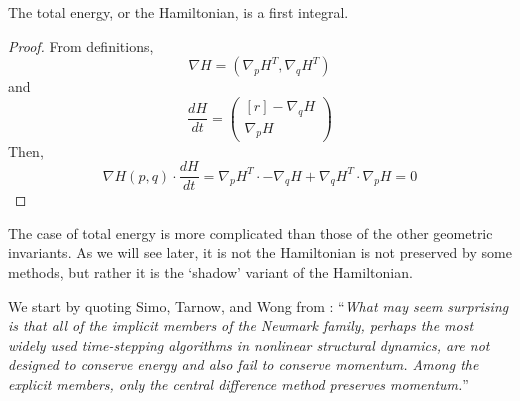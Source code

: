 \documentclass[../Main.tex]{subfiles}
\begin{document}
\begin{theorem} The total energy, or the Hamiltonian, is a first integral. \end{theorem}
\begin{proof}
From definitions,
$$
	\nabla H = \left(\nabla_{p}H^{T}, \nabla_{q}H^{T}\right)
$$
and
$$
	\frac{dH}{dt} =
		\begin{pmatrix*}[r]
			-\nabla_{q}H \\
			\nabla_{p}H
		\end{pmatrix*}
$$
Then, 
$$
\nabla H(p, q) \cdot \frac{dH}{dt} = \nabla_{p}H^{T}\cdot-\nabla_{q}H + \nabla_{q}H^{T}\cdot \nabla_{p}H = 0
$$ 
\end{proof} 

The case of total energy is more complicated than those of the other geometric invariants. As we will see later, it is not the Hamiltonian is not preserved by some methods, but rather it is the `shadow' variant of the Hamiltonian.

We start by quoting Simo, Tarnow, and Wong from \cite{SimoTarnowWong1992}:
``\textit{What may seem surprising is that all of the implicit members of the Newmark family, perhaps the most widely used time-stepping algorithms in nonlinear structural dynamics, are not designed to conserve energy and also fail to conserve momentum. Among the explicit members, only the central difference method preserves momentum.}''
\end{document}
